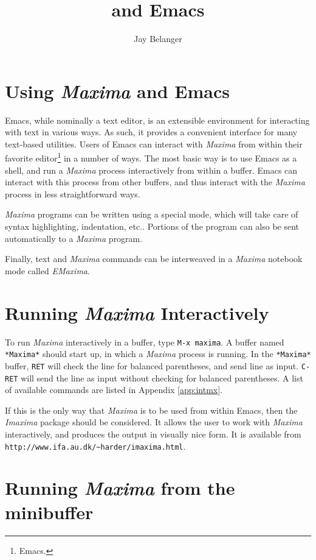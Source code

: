 \documentclass{article}
\title{\mx{} and Emacs}
\author{Jay Belanger}
\date{}
\newcommand{\emx}{\textsl{\sffamily EMaxima}}
\newcommand{\mx}{\textsl{\sffamily Maxima}}
\begin{document}
\maketitle

\section{Using \mx{} and Emacs}

Emacs, while nominally a text editor, is an extensible environment for
interacting with text in various ways.  As such, it provides a
convenient interface for many text-based utilities.  Users of Emacs
can interact with \mx{} from within their favorite
editor\footnote{Emacs.} in a number of ways.  The most basic way is to
use Emacs as a shell, and run a \mx{} process interactively from
within a buffer.  Emacs can interact with this process from other
buffers, and thus interact with the \mx{} process in less
straightforward ways.

\mx{} programs can be written using a special mode, which will take
care of syntax highlighting, indentation, etc..  Portions of the
program can also be sent automatically to a \mx{} program.

Finally, text and \mx{} commands can be interweaved in a \mx{}
notebook mode called \emx{}.

\section{Running \mx{} Interactively}

To run \mx{} interactively in a buffer, type \texttt{M-x maxima}.  A
buffer named \texttt{*Maxima*} should start up, in which a \mx{}
process is running.  In the \texttt{*Maxima*} buffer, \texttt{RET}
will check the line for balanced parentheses, and send line as input.
\texttt{C-RET} will send the line as input without checking for
balanced parentheses.  A list of available commands are listed in
Appendix \ref{app:intmx}.

If this is the only way that \mx{} is to be used from within Emacs,
then the \textsl{Imaxima} package should be considered.  It allows the
user to work with \mx{} interactively, and produces the output in
visually nice form.  It is available from
\verb+http://www.ifa.au.dk/~harder/imaxima.html+.

\section{Running \mx{} from the minibuffer}
\end{document}
